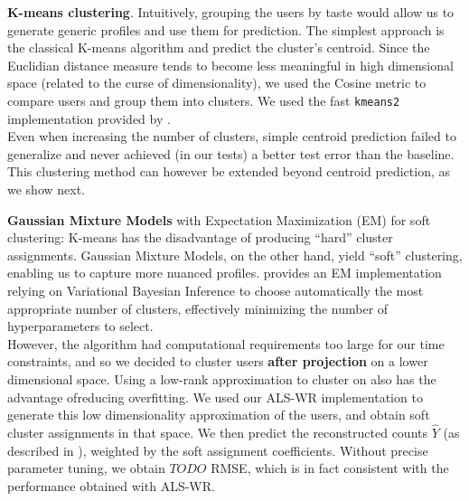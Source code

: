 \documentclass[10pt,a4paper]{article}
\begin{document}
    \noindent
    \textbf{K-means clustering}. Intuitively, grouping the users by taste would allow us to generate generic profiles and use them for prediction. The simplest approach is the classical K-means algorithm and predict the cluster's centroid. Since the Euclidian distance measure tends to become less meaningful in high dimensional space (related to the curse of dimensionality), we used the Cosine metric to compare users and group them into clusters. We used the fast \texttt{kmeans2} implementation provided by \cite{piotrtoolbox}.\\
    Even when increasing the number of clusters, simple centroid prediction failed to generalize and never achieved (in our tests) a better test error than the baseline. This clustering method can however be extended beyond centroid prediction, as we show next.

    \noindent
    \textbf{Gaussian Mixture Models} with Expectation Maximization (EM) for soft clustering: K-means has the disadvantage of producing ``hard'' cluster assignments. Gaussian Mixture Models, on the other hand, yield ``soft'' clustering, enabling us to capture more nuanced profiles. \cite{gaussian-mixture-model-script} provides an EM implementation relying on Variational Bayesian Inference to choose automatically the most appropriate number of clusters, effectively minimizing the number of hyperparameters to select.\\
    However, the algorithm had computational requirements too large for our time constraints, and so we decided to cluster users \textbf{after projection} on a lower dimensional space. Using a low-rank approximation to cluster on also has the advantage ofreducing overfitting. We used our ALS-WR implementation to generate this low dimensionality approximation of the users, and obtain soft cluster assignments in that space. We then predict the reconstructed counts $\hat Y$ (as described in \cite{alswr}), weighted by the soft assignment coefficients. Without precise parameter tuning, we obtain $TODO$ RMSE, which is in fact consistent with the performance obtained with ALS-WR.\\
\end{document}
